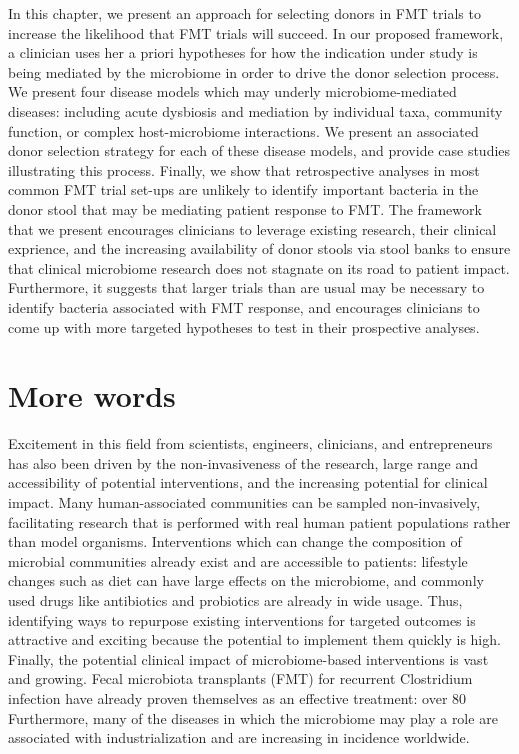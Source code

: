 In this chapter, we present an approach for selecting donors in FMT trials to increase the likelihood that FMT trials will succeed.
In our proposed framework, a clinician uses her a priori hypotheses for how the indication under study is being mediated by the microbiome in order to drive the donor selection process.
We present four disease models which may underly microbiome-mediated diseases: including acute dysbiosis and mediation by individual taxa, community function, or complex host-microbiome interactions.
We present an associated donor selection strategy for each of these disease models, and provide case studies illustrating this process.
Finally, we show that retrospective analyses in most common FMT trial set-ups are unlikely to identify important bacteria in the donor stool that may be mediating patient response to FMT.
The framework that we present encourages clinicians to leverage existing research, their clinical exprience, and the increasing availability of donor stools via stool banks to ensure that clinical microbiome research does not stagnate on its road to patient impact.
Furthermore, it suggests that larger trials than are usual may be necessary to identify bacteria associated with FMT response, and encourages clinicians to come up with more targeted hypotheses to test in their prospective analyses.


\section{More words}


Excitement in this field from scientists, engineers, clinicians, and entrepreneurs has also been driven by the non-invasiveness of the research, large range and accessibility of potential interventions, and the increasing potential for clinical impact.
Many human-associated communities can be sampled non-invasively, facilitating research that is performed with real human patient populations rather than model organisms.
Interventions which can change the composition of microbial communities already exist and are accessible to patients: lifestyle changes such as diet can have large effects on the microbiome, and commonly used drugs like antibiotics and probiotics are already in wide usage.
Thus, identifying ways to repurpose existing interventions for targeted outcomes is attractive and exciting because the potential to implement them quickly is high.
Finally, the potential clinical impact of microbiome-based interventions is vast and growing.
Fecal microbiota transplants (FMT) for recurrent Clostridium infection have already proven themselves as an effective treatment: over 80%
Furthermore, many of the diseases in which the microbiome may play a role are associated with industrialization and are increasing in incidence worldwide.

